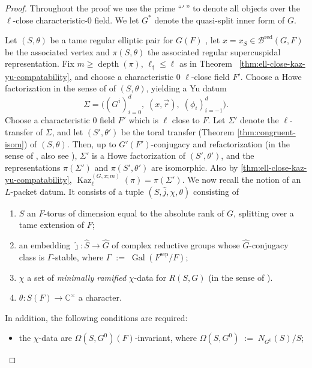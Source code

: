 \documentclass[american]{article}
\numberwithin{equation}{section}
\numberwithin{figure}{section}
\theoremstyle{plain}
\theoremstyle{definition}
\theoremstyle{remark}
\DeclareMathOperator{\depth}{depth}
\DeclareMathOperator{\Gal}{Gal}
\DeclareMathOperator{\Kaz}{Kaz}
\DeclareMathOperator{\red}{red}
\newcommand{\C}{\mathbb{C}}
\begin{document}
\begin{proof}
Throughout the proof we use the prime ``\('\,\)'' to denote all objects over the
\(\ell\)-close characteristic-\(0\) field. We let \(G^*\) denote the quasi-split inner form of \(G\).

Let $(S,\theta)$ be a tame regular elliptic pair for $G(F)$ \cite[Definition 3.7.5]{KalethaRegSC}, let $x=x_S\in \mathcal B^{\red}(G,F)$ be the associated vertex and \(\pi(S,\theta)\) the associated regular supercuspidal representation. Fix $m\ge \depth(\pi)$, $\ell_{\dagger}\le \ell$ as in Theorem ~\ref{thm:ell-close-kaz-yu-compatability}, and choose a characteristic \(0\) \(\ell\)-close field \(F'\). Choose a  Howe factorization in the sense of \cite[Definition 3.6.2]{KalethaRegSC} of $(S,\theta)$, yielding a Yu datum
\[
  \Sigma=\bigl((G^i)_{i=0}^d,\; (x, \vec r),\; (\phi_i)_{i=-1}^d\bigr).
\]
Choose a characteristic 0 field \(F'\) which is \(\ell\) close to \(F\). Let $\Sigma'$ denote the $\ell$-transfer of $\Sigma$, and let $(S',\theta')$ be the toral transfer (Theorem \ref{thm:congruent-isom}) of $(S,\theta)$. Then, up to $G'(F')$-conjugacy and refactorization (in the sense of \cite{HM08}, also see \cite[Lemma 3.6.6]{KalethaRegSC}), $\Sigma'$ is a  Howe factorization of $(S',\theta')$, and the  representations \(\pi(\Sigma')\) and \(\pi(S',\theta')\) are isomorphic. Also by \ref{thm:ell-close-kaz-yu-compatability}, \(\Kaz_{\ell}^{(G,x;m)}(\pi)=\pi(\Sigma')\).
We now recall the notion of an \(L\)-packet datum. It consists of a tuple \((S,\widehat{j},\chi,\theta)  \) consisting of
\begin{enumerate}
  \item $S$ an $F$-torus of dimension equal to the absolute rank of $G$, splitting over a tame extension of $F$; 
  \item an embedding $\widehat{\jmath}:\widehat{S}\to\widehat{G}$ of complex reductive groups whose $\widehat{G}$-conjugacy class is $\Gamma$-stable, where \(\Gamma \;:=\; \Gal(F^{\mathrm{sep}}/F)\); 
  \item $\chi$ a set of \emph{minimally ramified} $\chi$-data for $R(S,G)$ (in the sense of \cite[Definition 4.6.1]{KalethaRegSC}).
  \item $\theta:S(F)\to\C^\times$ a character. 
\end{enumerate}
In addition, the following conditions are required:
\begin{itemize}
  \item the $\chi$-data are $\Omega(S,G^{0})(F)$-invariant, where \(\Omega(S,G^{0}) \;:=\; N_{G^{0}}(S)/S \); 

\end{itemize}
\end{proof}
\end{document}
